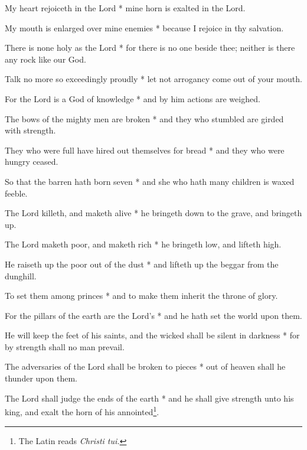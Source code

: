 My heart rejoiceth in the Lord * mine horn is exalted in the Lord.

My mouth is enlarged over mine enemies * because I rejoice in thy salvation.

There is none holy as the Lord * for there is no one beside thee; neither is there any rock like our God.

Talk no more so exceedingly proudly * let not arrogancy come out of your mouth.

For the Lord is a God of knowledge * and by him actions are weighed.

The bows of the mighty men are broken * and they who stumbled are girded with strength.

They who were full have hired out themselves for bread * and they who were hungry ceased.

So that the barren hath born seven * and she who hath many children is waxed feeble.

The Lord killeth, and maketh alive * he bringeth down to the grave, and bringeth up.

The Lord maketh poor, and maketh rich * he bringeth low, and lifteth high.

He raiseth up the poor out of the dust * and lifteth up the beggar from the dunghill.

To set them among princes * and to make them inherit the throne of glory.

For the pillars of the earth are the Lord's * and he hath set the world upon them.

He will keep the feet of his saints, and the wicked shall be silent in darkness * for by strength shall no man prevail.

The adversaries of the Lord shall be broken to pieces * out of heaven shall he thunder upon them.

The Lord shall judge the ends of the earth * and he shall give strength unto his king, and exalt the horn of his annointed\footnote{The Latin reads \textit{Christi tui.}}.
